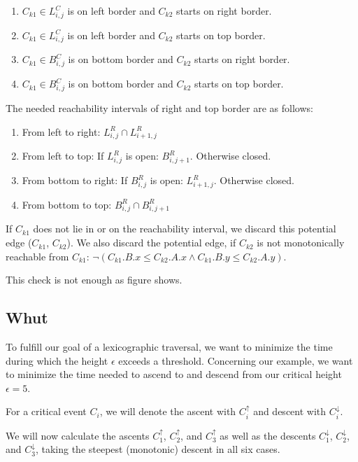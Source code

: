 \begin{enumerate}
	\item $C_{k1} \in L_{i, j}^C$ is on left border and $C_{k2}$ starts on right border.
	\item $C_{k1} \in L_{i, j}^C$ is on left border and $C_{k2}$ starts on top border.
	\item $C_{k1} \in B_{i, j}^C$ is on bottom border and $C_{k2}$ starts on right border.
	\item $C_{k1} \in B_{i, j}^C$ is on bottom border and $C_{k2}$ starts on top border.
\end{enumerate}

The needed reachability intervals of right and top border are as follows:

\begin{enumerate}
	\item From left to right: $L_{i, j}^R \cap L_{i+1, j}^R$
	\item From left to top: If $L_{i, j}^R$ is open: $B_{i, j+1}^R$. Otherwise closed.
	\item From bottom to right: If $B_{i, j}^R$ is open: $L_{i+1, j}^R$. Otherwise closed.
	\item From bottom to top: $B_{i, j}^R \cap B_{i, j+1}^R$
\end{enumerate}

If $C_{k1}$ does not lie in or on the reachability interval, we discard this potential edge ($C_{k1}$, $C_{k2}$). We also discard the potential edge, if $C_{k2}$ is not monotonically reachable from $C_{k1}$: $\neg(C_{k1}.B.x \leq C_{k2}.A.x \wedge C_{k1}.B.y \leq C_{k2}.A.y)$.

This check is not enough as figure \cite{fig:gengraph_ex} shows.




\subsection{Whut}

To fulfill our goal of a lexicographic traversal, we want to minimize the time during which the height $\epsilon$ exceeds a threshold.\cite{rotelex} Concerning our example, we want to minimize the time needed to ascend to and descend from our critical height $\epsilon = 5$. 

For a critical event $C_i$, we will denote the ascent with $C_i^\uparrow$ and descent with $C_i^\downarrow$.

We will now calculate the ascents $C_1^\uparrow$, $C_2^\uparrow$, and $C_3^\uparrow$ as well as the descents $C_1^\downarrow$, $C_2^\downarrow$, and $C_3^\downarrow$, taking the steepest (monotonic) descent in all six cases.


